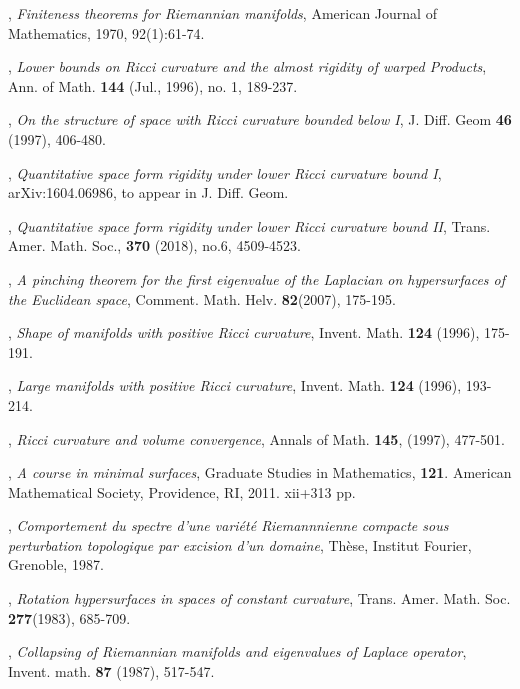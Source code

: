 \documentclass{amsart}
\numberwithin{equation}{section}
\theoremstyle{remark}
\renewcommand{\(}{\left(}
\renewcommand{\)}{\right)}
\renewcommand{\~}{\tilde}
\renewcommand{\-}{\overline}
\begin{document}
\begin{thebibliography}{10}
, {\em Finiteness theorems for Riemannian manifolds}, American Journal of Mathematics, 1970, 92(1):61-74.


, {\em Lower bounds on Ricci curvature and the almost rigidity of warped Products}, Ann. of Math. {\bf 144} (Jul., 1996), no. 1, 189-237.

, {\em On the structure of space with Ricci curvature bounded below I}, J. Diff. Geom {\bf 46} (1997), 406-480.

, {\em Quantitative space form rigidity under lower Ricci curvature bound I}, arXiv:1604.06986, to appear in J. Diff. Geom.

, {\em Quantitative space form rigidity under lower Ricci curvature bound II}, Trans. Amer. Math. Soc., {\bf 370} (2018), no.6, 4509-4523.

, {\em A pinching theorem for the first eigenvalue of the Laplacian on hypersurfaces of the Euclidean space}, Comment. Math. Helv. {\bf 82}(2007), 175-195.

, {\em Shape of manifolds with positive Ricci curvature}, Invent. Math. {\bf 124} (1996), 175-191.
	
, {\em Large manifolds with positive Ricci curvature}, Invent. Math. {\bf 124} (1996), 193-214.

, {\em Ricci curvature and volume convergence}, Annals of Math. {\bf 145}, (1997), 477-501.

, {\em A course in minimal surfaces}, Graduate Studies in Mathematics,
{\bf 121}. American Mathematical Society, Providence, RI, 2011. xii+313 pp.

, {\em Comportement du spectre d'une vari\'et\'e Riemannnienne compacte sous perturbation topologique par excision d'un domaine}, Th\`ese, Institut Fourier, Grenoble, 1987.		

, {\em Rotation hypersurfaces in spaces of constant curvature}, Trans. Amer. Math. Soc. {\bf 277}(1983), 685-709.


, {\em Collapsing of Riemannian manifolds and eigenvalues of Laplace operator},
Invent. math. {\bf 87} (1987), 517-547.


\end{thebibliography}
\end{document}
